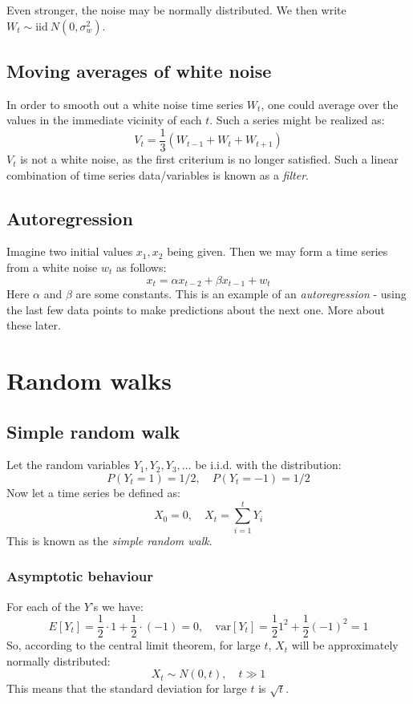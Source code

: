 \documentclass[12pt, a4paper]{article}
\numberwithin{equation}{section}
\begin{document}
Even stronger, the noise may be normally distributed. We then write $W_t\sim \textrm{iid}\ N(0,\sigma_w^2)$.

\subsection{Moving averages of white noise}
In order to smooth out a white noise time series $W_t$, one could average over the values in the immediate vicinity of each $t$. Such a series might be realized as:
\begin{equation}
\label{moving_average}
V_t=\frac{1}{3}(W_{t-1}+W_t+W_{t+1})
\end{equation}
$V_t$ is not a white noise, as the first criterium is no longer satisfied. Such a linear combination of time series data/variables is known as a \textit{filter}.

\subsection{Autoregression}
Imagine two initial values $x_1, x_2$ being given. Then we may form a time series from a white noise $w_t$ as follows:
\begin{equation}
x_t=\alpha x_{t-2}+\beta x_{t-1}+w_t
\end{equation}
Here $\alpha$ and $\beta$ are some constants. This is an example of an \textit{autoregression} - using the last few data points to make predictions about the next one. More about these later.

\section{Random walks}

\subsection{Simple random walk}
Let the random variables $Y_1, Y_2, Y_3,\ldots$ be i.i.d. with the distribution:
\begin{equation}
P(Y_t=1)=1/2,\quad P(Y_t=-1)=1/2
\end{equation}
Now let a time series be defined as:
\begin{equation}
X_0=0,\quad X_t=\sum_{i=1}^t Y_i
\end{equation}
This is known as the \textit{simple random walk}.

\subsubsection{Asymptotic behaviour}
For each of the $Y$'s we have:
\begin{equation}
E[Y_t]=\frac{1}{2}\cdot 1+\frac{1}{2}\cdot(-1)=0,\quad\textrm{var}[Y_t]=\frac{1}{2}1^2+\frac{1}{2}(-1)^2=1
\end{equation}
So, according to the central limit theorem, for large $t$, $X_t$ will be approximately normally distributed:
\begin{equation}
X_t\sim N(0,t),\quad t\gg 1
\end{equation}
This means that the standard deviation for large $t$ is $\sqrt{t}$.
\end{document}
